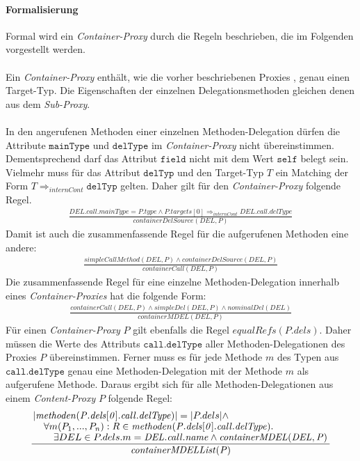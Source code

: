 \documentclass[a4paper,12pt]{article}
\begin{document}
\paragraph{Formalisierung}
Formal wird ein \emph{Container-Proxy} durch die Regeln beschrieben, die im Folgenden vorgestellt werden.\\\\
Ein \emph{Container-Proxy} enthält, wie die vorher beschriebenen Proxies , genau einen Target-Typ. Die Eigenschaften der einzelnen Delegationsmethoden gleichen denen aus dem \emph{Sub-Proxy}.\\\\
In den angerufenen Methoden einer einzelnen Methoden-Delegation dürfen die Attribute $\texttt{mainType}$ und $\texttt{delType}$ im \emph{Container-Proxy} nicht übereinstimmen. Dementsprechend darf das Attribut $\texttt{field}$ nicht mit dem Wert $\texttt{self}$ belegt sein. Vielmehr muss für das Attribut $\texttt{delTyp}$ und den Target-Typ $T$ ein Matching der Form $T \Rightarrow_{internCont} \texttt{delTyp}$ gelten. Daher gilt für den \emph{Container-Proxy} folgende Regel.
\begin{gather*}
\frac{\mathit{DEL.call.mainType} = \mathit{P.type} \wedge \mathit{P.targets[0]} \Rightarrow_{internCont} \mathit{DEL.call.delType}}
{\mathit{containerDelSource(DEL,P)}}
\end{gather*}
\noindent
Damit ist auch die zusammenfassende Regel für die aufgerufenen Methoden eine andere:
\begin{gather*}
\frac{\mathit{simpleCallMethod(DEL,P)} \wedge \mathit{containerDelSource(DEL,P)}}
{containerCall(DEL,P)}
\end{gather*}
Die zusammenfassende Regel für eine einzelne Methoden-Delegation innerhalb eines \emph{Container-Proxies} hat die folgende Form:
\begin{gather*}
\frac{\mathit{containerCall(DEL,P)} \wedge \mathit{simpleDel(DEL,P) \wedge \mathit{nominalDel(DEL)}}}
{containerMDEL(DEL,P)}
\end{gather*}
Für einen \emph{Container-Proxy} $P$ gilt ebenfalls die Regel $\mathit{equalRefs(P.dels)}$. Daher müssen die Werte des Attributs $\texttt{call.delType}$ aller Methoden-Delegationen des Proxies $P$ übereinstimmen. Ferner muss es für jede Methode $m$ des Typen aus $\texttt{call.delType}$ genau eine Methoden-Delegation mit der Methode $m$ als aufgerufene Methode. Daraus ergibt sich für alle Methoden-Delegationen aus einem \emph{Content-Proxy} $P$ folgende Regel:
\begin{gather*}
\frac{\splitfrac{|\mathit{methoden(P.dels[0].call.delType)}| = |P.dels| \wedge}{ \splitfrac{\forall m(P_1,...,P_n):R \in \mathit{methoden(P.dels[0].call.delType)}.}{\exists DEL \in P.dels.m = \mathit{DEL.call.name} \wedge \mathit{containerMDEL(DEL,P)}
 }}
}
{\mathit{containerMDELList(P)}}
\end{gather*}
\end{document}
